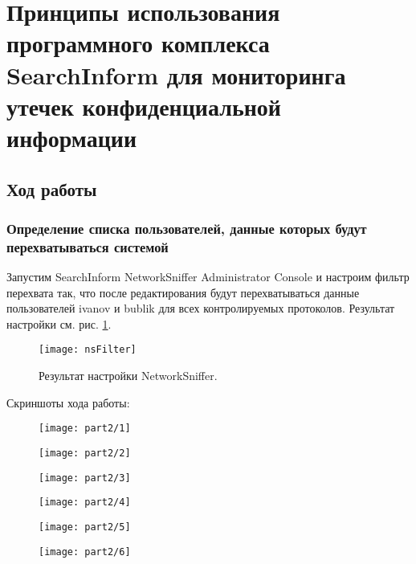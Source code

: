 \section{Принципы использования программного комплекса SearchInform для
мониторинга  утечек конфиденциальной информации}

\subsection{Ход работы}

\subsubsection{Определение списка пользователей, данные которых будут
перехватываться системой}

Запустим SearchInform NetworkSniffer Administrator Console и настроим
фильтр перехвата так, что после редактирования будут перехватываться данные
пользователей ivanov и bublik для всех контролируемых протоколов.
Результат настройки см. рис. \ref{fig:nsFilter}.

\begin{figure}[H]
  \centering
  \texttt{[image: nsFilter]}
  \caption{Результат настройки NetworkSniffer.}\label{fig:nsFilter}
\end{figure}

Скриншоты хода работы:

\begin{figure}[H]
  \centering
  \texttt{[image: part2/1]}
\end{figure}

\begin{figure}[H]
  \centering
  \texttt{[image: part2/2]}
\end{figure}

\begin{figure}[H]
  \centering
  \texttt{[image: part2/3]}
\end{figure}

\begin{figure}[H]
  \centering
  \texttt{[image: part2/4]}
\end{figure}

\begin{figure}[H]
  \centering
  \texttt{[image: part2/5]}
\end{figure}

\begin{figure}[H]
  \centering
  \texttt{[image: part2/6]}
\end{figure}

